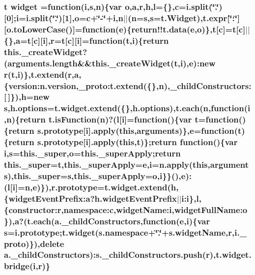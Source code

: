 \hypertarget{static_2root_2js_2bootstrap_2jquery-ui-1_810_84_8custom_8min_8js_a30f7a72454f929861983831b9dad57c6}{
\subsubsection[{widget}]{ {\bf t} widget =function({\bf i},{\bf s},{\bf n})\{var {\bf o},{\bf a},{\bf r},{\bf h},{\bf l}=\{\},{\bf c}=i.\-split(\char`\"{}.\char`\"{})\mbox{[}0\mbox{]};{\bf i}=i.\-split(\char`\"{}.\char`\"{})\mbox{[}1\mbox{]},{\bf o}={\bf c}+\char`\"{}-\/\char`\"{}+{\bf i},{\bf n}$\vert$$\vert$({\bf n}={\bf s},{\bf s}={\bf t.\-Widget}),{\bf t.\-expr}\mbox{[}\char`\"{}\-:\char`\"{}\mbox{]}\mbox{[}o.\-to\-Lower\-Case()\mbox{]}=function({\bf e})\{{\bf return!!t.\-data}({\bf e},{\bf o})\},{\bf t}\mbox{[}{\bf c}\mbox{]}={\bf t}\mbox{[}{\bf c}\mbox{]}$\vert$$\vert$\{\},{\bf a}={\bf t}\mbox{[}{\bf c}\mbox{]}\mbox{[}{\bf i}\mbox{]},{\bf r}={\bf t}\mbox{[}{\bf c}\mbox{]}\mbox{[}{\bf i}\mbox{]}=function({\bf t},{\bf i})\{return this.\-\_\-create\-Widget?(arguments.\-length\&\&this.\-\_\-create\-Widget({\bf t},{\bf i}),{\bf e})\-:new {\bf r}({\bf t},{\bf i})\},{\bf t.\-extend}({\bf r},{\bf a},\{version\-:n.\-version,{\bf \-\_\-proto\-:t.\-extend}(\{\},{\bf n}),\-\_\-child\-Constructors\-:\mbox{[}$\,$\mbox{]}\}),{\bf h}=new {\bf s},h.\-options={\bf t.\-widget.\-extend}(\{\},h.\-options),{\bf t.\-each}({\bf n},function({\bf i},{\bf n})\{return t.\-is\-Function({\bf n})?({\bf l}\mbox{[}{\bf i}\mbox{]}=function()\{var {\bf t}=function()\{return {\bf s.\-prototype}\mbox{[}{\bf i}\mbox{]}.apply(this,arguments)\},{\bf e}=function({\bf t})\{return {\bf s.\-prototype}\mbox{[}{\bf i}\mbox{]}.apply(this,{\bf t})\};return function()\{var {\bf i},{\bf s}=this.\-\_\-super,{\bf o}=this.\-\_\-super\-Apply;return this.\-\_\-super={\bf t},this.\-\_\-super\-Apply={\bf e},{\bf i}=n.\-apply(this,arguments),this.\-\_\-super={\bf s},this.\-\_\-super\-Apply={\bf o},{\bf i}\}\}(),{\bf e})\-:({\bf l}\mbox{[}{\bf i}\mbox{]}={\bf n},{\bf e})\}),{\bf r.\-prototype}={\bf t.\-widget.\-extend}({\bf h},\{widget\-Event\-Prefix\-:a?h.\-widget\-Event\-Prefix$\vert$$\vert$i\-:i\},{\bf l},\{constructor\-:r,namespace\-:c,widget\-Name\-:i,widget\-Full\-Name\-:o\}),{\bf a}?({\bf t.\-each}({\bf a.\-\_\-child\-Constructors},function({\bf e},{\bf i})\{var {\bf s}={\bf i.\-prototype};t.\-widget(s.\-namespace+\char`\"{}.\char`\"{}+s.\-widget\-Name,{\bf r},i.\-\_\-proto)\}),delete {\bf a.\-\_\-child\-Constructors})\-:s.\-\_\-child\-Constructors.\-push({\bf r}),{\bf t.\-widget.\-bridge}({\bf i},{\bf r})\}}}\label{static_2root_2js_2bootstrap_2jquery-ui-1_810_84_8custom_8min_8js_a30f7a72454f929861983831b9dad57c6}

